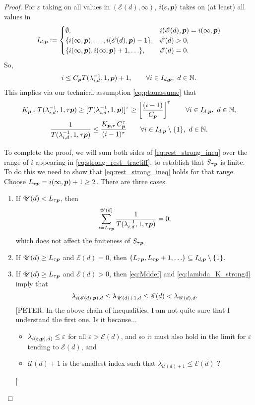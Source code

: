 \documentclass[sort&compress]{elsarticle}
\newcommand{\theM}{\mathscr{E}}
\newcommand{\theUB}{\mathscr{U}}
\newcommand{\peter}[1]{\begingroup\color{purple}#1\endgroup}
\begin{document}
\begin{proof}
For $\varepsilon$ taking on all values in $(\theM(d),\infty)$, $i(\varepsilon,\boldsymbol{p})$ takes on (at least) all values in
\[
I_{d,\vp}:=\begin{cases} 
\emptyset, & i(\theM(d),\vp) = i(\infty,\vp) \\
\{i(\infty,\vp),\ldots, i(\theM(d),\vp)-1\}, & \theM(d) > 0, \\
\{i(\infty,\vp), i(\infty,\vp) + 1, \ldots\}, & \theM(d) = 0.
\end{cases}
\]
So,
\[
i\le  C_{\boldsymbol{p}} T(\lambda_{i,d}^{-1},1,\boldsymbol{p})+1, \qquad \forall i\in I_{d,\boldsymbol{p}},  \ d \in \mathbb{N}.
\]
This implies via our technical assumption \eqref{eq:ptauassume} that
\begin{gather}
\nonumber
 K_{\boldsymbol{p},\tau}\,T (\lambda_{i,d}^{-1},1,\tau \boldsymbol{p}) \ge
 [T(\lambda_{i,d}^{-1},1, \boldsymbol{p})]^\tau
 \ge
  \left[\frac{(i-1)}{C_{\boldsymbol{p}}}\right]^\tau \qquad \forall i\in I_{d,\boldsymbol{p}},  \ d \in \mathbb{N}, \\
  \label{eq:rest_strong_ineq}
 \frac{1}{T (\lambda_{i,d}^{-1},1,\tau \boldsymbol{p})} \le
\frac{K_{\boldsymbol{p},\tau}\, C_{\boldsymbol{p}}^\tau}{(i-1)^\tau}\qquad \forall i \in I_{d,\boldsymbol{p}} \setminus\{1\}, \ d \in \mathbb{N} .
\end{gather}


To complete the proof, we will sum both sides of \eqref{eq:rest_strong_ineq} over the range of $i$ appearing in \eqref{eq:strong_rest_tractiff}, to establish that $S_{\tau\boldsymbol{p}}$ is finite.  To do this we need to show that \eqref{eq:rest_strong_ineq} holds for that range.  Choose $L_{\tau\boldsymbol{p}} = i(\infty,\boldsymbol{p}) +1 \ge 2$. There are three cases.
\begin{enumerate}
\renewcommand{\labelenumi}{\roman{enumi})}


\item If $\theUB(d) < L_{\tau\vp}$, then 
\[
\sum_{i = L_{\tau\vp}}^{\theUB(d)} \frac{1}{T (\lambda_{i,d}^{-1},1, \tau \vp)} = 0,
\]
which does not affect the finiteness of $S_{\tau\boldsymbol{p}}$.

\item If $\theUB(d) \ge L_{\tau\vp}$ and $\theM(d) = 0$, then $\{L_{\tau\boldsymbol{p}},  L_{\tau\boldsymbol{p}} + 1, \ldots \} \subseteq I_{d,\boldsymbol{p}} \setminus \{1\}$.  

\item If $\theUB(d) \ge L_{\tau\vp}$ and $\theM(d) >0$, then \eqref{eq:Mddef} and \eqref{eq:lambda_K_strong4} imply that
\[
\lambda_{i(\theM(d),\vp),d} \le \lambda_{\theUB(d)+1,d} \le \theM(d) < \lambda_{\theUB(d),d}.
\]
\peter{
[PETER. In the above chain of inequalities, I am not quite sure that I understand the first one. Is it because...
\begin{itemize}
    \item $\lambda_{i(\varepsilon,\boldsymbol{p}),d)} \le \varepsilon$ for all $\varepsilon>\theM(d)$, and so it must also hold in the limit for $\varepsilon$ tending to $\theM(d)$, and
    \item $\theUB (d) +1$ is the smallest index such that $\lambda_{\theUB (d) +1} \le \theM(d)$ ?
\end{itemize}]

}
\end{enumerate}
\end{proof}
\end{document}
